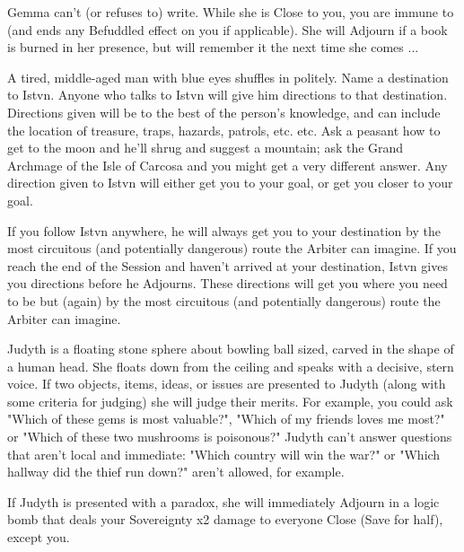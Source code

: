 Gemma can't (or refuses to) write.  While she is Close to you, you are immune to  (and ends any Befuddled effect on you if applicable). She will Adjourn if a book is burned in her presence, but will remember it the next time she comes ...


A tired, middle-aged man with blue eyes shuffles in politely. Name a destination to Istv{\AccentA}n. Anyone who talks to Istv{\AccentA}n will give him directions to that destination.  Directions given will be to the best of the person's knowledge, and can include the location of treasure, traps, hazards, patrols, etc. etc.  Ask a peasant how to get to the moon and he'll shrug and suggest a mountain; ask the Grand Archmage of the Isle of Carcosa and you might get a very different answer. Any direction given to Istv{\AccentA}n will either get you to your goal, or get you closer to your goal.

If you follow Istv{\AccentA}n anywhere, he will always get you to your destination by the most circuitous (and potentially dangerous) route the Arbiter can imagine. If you reach the end of the Session and haven't arrived at your destination, Istv{\AccentA}n gives you directions before he Adjourns. These directions will get you where you need to be but (again) by the most circuitous (and potentially dangerous) route the Arbiter can imagine.



Judyth is a floating stone sphere about bowling ball sized, carved in the shape of a human head.  She floats down from the ceiling and speaks with a decisive, stern voice.  If two objects, items, ideas, or issues are presented to Judyth (along with some criteria for judging) she will judge their merits. For example, you could ask "Which of these gems is most valuable?", "Which of my friends loves me most?" or "Which of these two mushrooms is poisonous?" Judyth can't answer questions that aren't local and immediate:  "Which country will win the war?" or "Which hallway did the thief run down?" aren't allowed, for example.  

If Judyth is presented with a paradox, she will immediately Adjourn in a logic bomb that deals your Sovereignty x2 damage to everyone Close (Save for half), except you.


